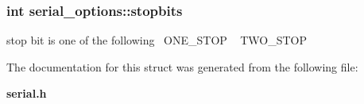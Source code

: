 \subsubsection[{stopbits}]{\setlength{\rightskip}{0pt plus 5cm}int serial\+\_\+options\+::stopbits}\label{structserial__options_ab0d4cc0e69f9da57b72d89ee2d4a2f3f}
stop bit is one of the following~\newline
 O\+N\+E\+\_\+\+S\+T\+OP ~\newline
 T\+W\+O\+\_\+\+S\+T\+OP ~\newline
 

The documentation for this struct was generated from the following file\+:\begin{DoxyCompactItemize}
\item 
{\bf serial.\+h}\end{DoxyCompactItemize}
